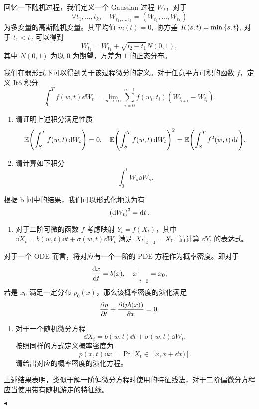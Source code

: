 \documentclass[11pt]{article}
\newenvironment{question}[2][Question]{\begin{trivlist}
\item[\hskip \labelsep {\bfseries #1}\hskip \labelsep {\bfseries #2.}]}{\hfill$\blacktriangleleft$\end{trivlist}}
\newcommand\E{\mathbb{E}}
\begin{document}
   \begin{question}{5 (10') (从 ODE 到 PDE)}~\\
    回忆一下随机过程，我们定义一个 Gaussian 过程 $W_t$，对于
    \[ \forall t_1, \ldots, t_k, \quad W_{t_1, \ldots, t_k} = (W_{t_1}, \ldots, W_{t_k}) \]
    为多变量的高斯随机变量。其平均值 $m(t) = 0,$ 协方差 $K(s, t) = \min\qty{s, t},$ 对于 $t_1 < t_2$ 可以得到
    \[ W_{t_2} = W_{t_1} + \sqrt{t_2 - t_1} N(0, 1), \]
    其中 $N(0, 1)$ 为以 $0$ 为期望，方差为 $1$ 的正态分布。

    我们在弱形式下可以得到关于该过程微分的定义。对于任意平方可积的函数 $f$，定义 It\^o 积分
    \[ \int_0^T f(w, t) \dd{W_t} = \lim_{n \to \infty} \sum_{i=0}^{n-1} f(w_i, t_i) (W_{t_{i+1}} - W_{t_i}). \]

    \begin{enumerate}
        \item [a (4')] 请证明上述积分满足性质
        \[ \E\qty(\int_S^T f(w, t) \dd{W_t}) = 0, \quad \E\qty(\int_S^T f(w, t) \dd{W_t})^2 = \E\qty(\int_S^T f^2(w, t) \dd{t}). \]
        \item [b (2')] 请计算如下积分
        \[ \int_0^t W_s \dd{W_s}. \]
    \end{enumerate}

    根据 b 问中的结果，我们可以形式化地认为有
    \[ \qty(\dd{W_t})^2 = \dd{t}. \]

    \begin{enumerate}
        \item [c (2')] 对于二阶可微的函数 $f$ 考虑映射 $Y_t = f(X_t)$，其中 $\dd{X_t} = b(w, t) \dd{t} + \sigma(w, t) \dd{W_t}$ 满足 $\eval{X_t}_{t=0} = X_0.$ 请计算 $\dd{Y_t}$ 的表达式。
    \end{enumerate}

    对于一个 ODE 而言，将对应有一个一阶的 PDE 方程作为概率密度。即对于
    \[ \dv{x}{t} = b(x), \quad \eval{x}_{t=0} = x_0, \]
    若是 $x_0$ 满足一定分布 $p_0(x)$，那么该概率密度的演化满足
    \[ \pdv{p}{t} + \pdv{(pb(x))}{x} = 0. \]

    \begin{enumerate}
        \item [d (2')] 对于一个随机微分方程
        \[ \dd{X_t} = b(w, t) \dd{t} + \sigma(w, t) \dd{W_t}, \]
        按照同样的方式定义概率密度为
        \[ p(x, t) \dd{x} = \operatorname{Pr}[X_t \in [x, x + \dd{x})]. \]
        请给出对应的概率密度的演化方程。
    \end{enumerate}

    上述结果表明，类似于解一阶偏微分方程时使用的特征线法，对于二阶偏微分方程应当使用带有随机游走的特征线。
    
   \end{question}
    
\end{document}
